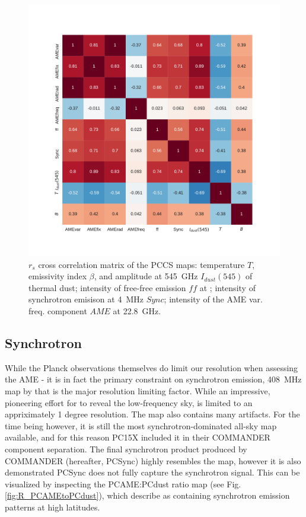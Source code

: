        \begin{figure}
         \includegraphics[width=\textwidth]{../Plots/ch_datasources/PCCS_corrmatrix.pdf}
         \centering
         \caption{$r_{s}$ cross correlation matrix of the PCCS maps: temperature $T$, emissivity index $\beta$, and amplitude at 545~GHz $I_{dust}(545)$ of thermal dust; intensity of free-free emission $ff$ at ; intensity of synchrotron emisison at 4~MHz $Sync$; intensity of the AME var. freq. component $AME$ at 22.8~GHz.}
         \label{fig:PCCS_corrmatrix}
       \end{figure}

       \subsection{Synchrotron}
        While the Planck observations themselves do limit our resolution when assessing the AME - it is in fact the primary constraint on synchrotron emission, 408~MHz map by \cite{haslam82} that is the major resolution limiting factor. While an impressive, pioneering effort for to reveal the low-frequency sky, \citep{haslam82} is limited to an appriximately 1 degree resolution. The map also contains
        many artifacts. For the time being however, it is still the most synchrotron-dominated all-sky map available, and for this reason PC15X included it in their COMMANDER component separation. The final synchrotron product produced by COMMANDER (hereafter, PCSync) highly resembles the \citep{haslam82} map, however it is also demonstrated PCSync does not fully capture the synchrotron signal. This can be visualized by inspecting the PCAME:PCdust ratio map (see Fig. \ref{fig:R_PCAMEtoPCdust}), which \cite{hensley16} describe as containing synchrotron emission patterns at high latitudes.

